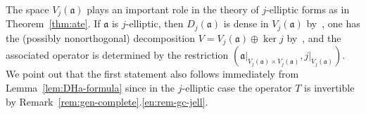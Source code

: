 \documentclass[a4paper,oneside,12pt]{amsart}
\theoremstyle{plain}
\theoremstyle{definition}
\begin{document}
The space $V_j({{\mathfrak{{a}}}})$ plays an important role in the theory of $j$-elliptic forms as in Theorem~\ref{thm:ate}.
If ${{\mathfrak{{a}}}}$ is $j$-elliptic, then $D_j({{\mathfrak{{a}}}})$ is dense in $V_j({{\mathfrak{{a}}}})$ by~\cite[Proposition~2.3\,(ii)]{AtE12:sect-form},
one has the (possibly nonorthogonal) decomposition $V=V_j({{\mathfrak{{a}}}})\oplus\ker j$ by~\cite[Theorem~2.5\,(i)]{AtE12:sect-form},
and the associated operator is determined by the restriction $({\ensuremath{{{{\mathfrak{{a}}}}}|_{{V_j({{\mathfrak{{a}}}})\times V_j({{\mathfrak{{a}}}})}}}},{\ensuremath{{j}|_{{V_j({{\mathfrak{{a}}}})}}}})$.
We point out that the first statement also follows immediately from
Lemma~\ref{lem:DHa-formula} since in the $j$-elliptic case the operator $T$ is invertible by Remark~\ref{rem:gen-complete}.\ref{en:rem-gc-jell}.
\end{document}

